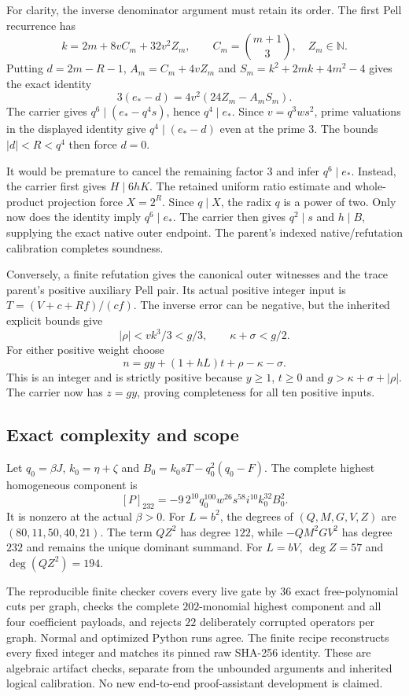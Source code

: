 For clarity, the inverse denominator argument must retain its order.
The first Pell recurrence has
\[
 k=2m+8vC_m+32v^2Z_m,\qquad
 C_m=\binom{m+1}{3},\quad Z_m\in\mathbb N.
\]
Putting $d=2m-R-1$, $A_m=C_m+4vZ_m$ and
$S_m=k^2+2mk+4m^2-4$ gives the exact identity
\[
 3(e_*-d)=4v^2(24Z_m-A_mS_m).
\]
The carrier gives $q^6\mid(e_*-q^4s)$, hence $q^4\mid e_*$.
Since $v=q^3ws^2$, prime valuations in the displayed identity give
$q^4\mid(e_*-d)$ even at the prime $3$.
The bounds $|d|<R<q^4$ then force $d=0$.

It would be premature to cancel the remaining factor $3$ and infer
$q^6\mid e_*$.  Instead, the carrier first gives $H\mid6hK$.
The retained uniform ratio estimate and whole-product projection force
$X=2^R$.  Since $q\mid X$, the radix $q$ is a power of two.  Only now
does the identity imply $q^6\mid e_*$.  The carrier then gives
$q^2\mid s$ and $h\mid B$, supplying the exact native outer endpoint.
The parent's indexed native/refutation calibration completes soundness.

Conversely, a finite refutation gives the canonical outer witnesses and
the trace parent's positive auxiliary Pell pair.  Its actual positive
integer input is $T=(V+c+Rf)/(cf)$.
The inverse error can be negative, but the inherited explicit bounds give
\[
 |\rho|<vk^3/3<g/3,\qquad \kappa+\sigma<g/2.
\]
For either positive weight choose
\[
 n=gy+(1+hL)t+\rho-\kappa-\sigma.
\]
This is an integer and is strictly positive because $y\ge1$, $t\ge0$
and $g>\kappa+\sigma+|\rho|$.  The carrier now has $z=gy$, proving
completeness for all ten positive inputs.

\subsection{Exact complexity and scope}

Let $q_0=\beta J$, $k_0=\eta+\zeta$ and
$B_0=k_0sT-q_0^2(q_0-F)$.  The complete highest homogeneous component is
\[
 [P]_{232}=-9\,2^{10}q_0^{100}w^{26}s^{58}i^{10}k_0^{32}B_0^2.
\]
It is nonzero at the actual $\beta>0$.
For $L=b^2$, the degrees of $(Q,M,G,V,Z)$ are
$(80,11,50,40,21)$.  The term $QZ^2$ has degree $122$, while
$-QM^2GV^2$ has degree $232$ and remains the unique dominant summand.
For $L=bV$, $\deg Z=57$ and $\deg(QZ^2)=194$.

The reproducible finite checker covers every live gate by $36$ exact
free-polynomial cuts per graph, checks the complete $202$-monomial highest
component and all four coefficient payloads, and rejects $22$ deliberately
corrupted operators per graph.  Normal and optimized Python runs agree.
The finite recipe reconstructs every fixed integer and matches its pinned
raw SHA-256 identity.  These are algebraic artifact checks, separate from
the unbounded arguments and inherited logical calibration.
No new end-to-end proof-assistant development is claimed.

